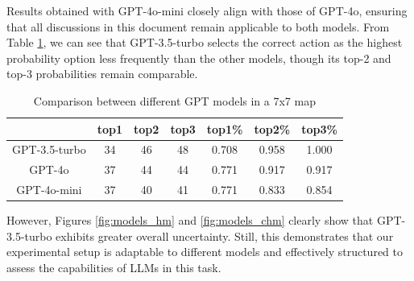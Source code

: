 Results obtained with GPT-4o-mini closely align with those of GPT-4o, ensuring
that all discussions in this document remain applicable to both models. From Table
\ref{tab:model_comparison}, we can see that GPT-3.5-turbo selects the correct
action as the highest probability option less frequently than the other models, though
its top-2 and top-3 probabilities remain comparable.

\begin{table}[h]
  \centering
  \begin{tabular}{c|ccc|ccc}
    \hline
                  & top1 & top2 & top3 & top1\% & top2\% & top3\% \\
    \hline
    GPT-3.5-turbo & 34   & 46   & 48   & 0.708  & 0.958  & 1.000  \\
    GPT-4o        & 37   & 44   & 44   & 0.771  & 0.917  & 0.917  \\
    GPT-4o-mini   & 37   & 40   & 41   & 0.771  & 0.833  & 0.854  \\
    \hline
  \end{tabular}
  \caption{Comparison between different GPT models in a 7x7 map}
  \label{tab:model_comparison}
\end{table}

However, Figures \ref{fig:models_hm} and \ref{fig:models_chm} clearly show that GPT-3.5-turbo
exhibits greater overall uncertainty. Still, this demonstrates that our experimental
setup is adaptable to different models and effectively structured to assess the capabilities
of LLMs in this task.

